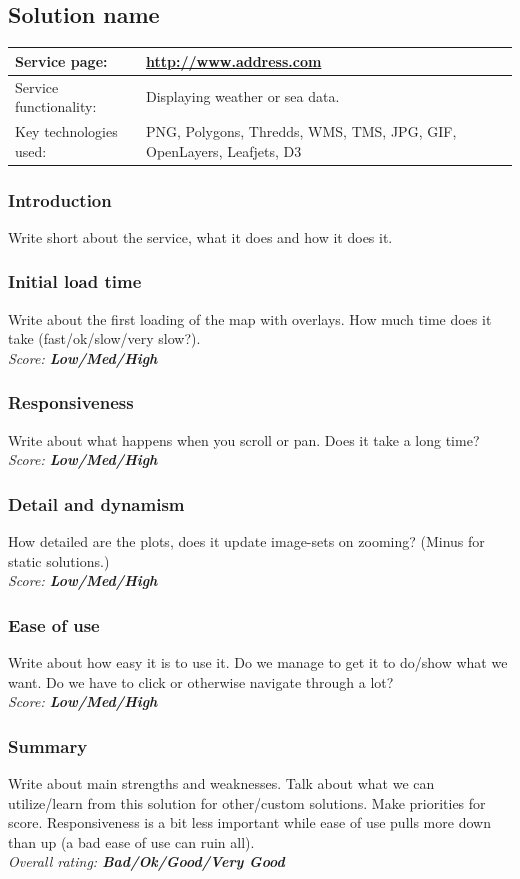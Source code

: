 \documentclass[11pt,a4paper,titlepage,oneside]{report}
\begin{document}
\subsection{Solution name}
\begin{tabular}{|p{4cm}|p{8cm}|}

\hline
Service page: & \url{http://www.address.com} \\%
\hline
Service functionality: & Displaying weather or sea data. \\
\hline
Key technologies used: & PNG, Polygons, Thredds, WMS, TMS, JPG, GIF, OpenLayers, Leafjets, D3 \\
\hline
\end{tabular}
\subsubsection{Introduction}
Write short about the service, what it does and how it does it.
\subsubsection{Initial load time}
Write about the first loading of the map with overlays. How much time does it take (fast/ok/slow/very slow?).
\\ \emph{Score: \textbf{Low/Med/High}}
\subsubsection{Responsiveness}
Write about what happens when you scroll or pan. Does it take a long time?
\\ \emph{Score: \textbf{Low/Med/High}}
\subsubsection{Detail and dynamism}
How detailed are the plots, does it update image-sets on zooming? (Minus for static solutions.) 
\\ \emph{Score: \textbf{Low/Med/High}}
\subsubsection{Ease of use}
Write about how easy it is to use it. Do we manage to get it to do/show what we want. Do we have to click or otherwise navigate through a lot?
\\ \emph{Score: \textbf{Low/Med/High}}
\subsubsection{Summary}
Write about main strengths and weaknesses. Talk about what we can utilize/learn from this solution for other/custom solutions. Make priorities for score. Responsiveness is a bit less important while ease of use pulls more down than up (a bad ease of use can ruin all).
\\ \emph{Overall rating: \textbf{Bad/Ok/Good/Very Good}}
\end{document}
